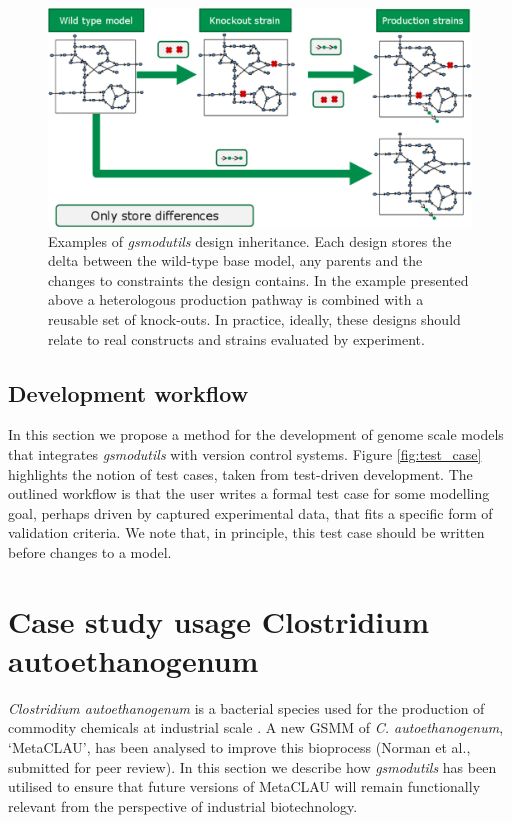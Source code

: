 \documentclass[journal=asbcd6]{achemso}
\begin{document}
\begin{figure}
  \includegraphics[width=\textwidth]{inheritence2.eps}
  \caption{Examples of \textit{gsmodutils} design inheritance.
  Each design stores the delta between the wild-type base model, any parents and the changes to constraints the design contains.
  In the example presented above a heterologous production pathway is combined with a reusable set of knock-outs.
  In practice, ideally, these designs should relate to real constructs and strains evaluated by experiment.
  }
    \label{fig:strain_hered}
\end{figure}

\subsection{Development workflow}
In this section we propose a method for the development of genome scale models that integrates \textit{gsmodutils} with version control systems.
Figure \ref{fig:test_case} highlights the notion of test cases, taken from test-driven development.
The outlined workflow is that the user writes a formal test case for some modelling goal, perhaps driven by captured experimental data, that fits a specific form of validation criteria.
We note that, in principle, this test case should be written before changes to a model.


\section{Case study usage Clostridium autoethanogenum}
\textit{Clostridium autoethanogenum} is a bacterial species used for the production of commodity chemicals at industrial scale \cite{abrini1994clostridium,norman2018progress,LT}. A new GSMM of \textit{C. autoethanogenum}, `MetaCLAU', has been analysed to improve this bioprocess (Norman et al., submitted for peer review).
In this section we describe how \textit{gsmodutils} has been utilised to ensure that future versions of MetaCLAU will remain functionally relevant from the perspective of industrial biotechnology.
\end{document}
